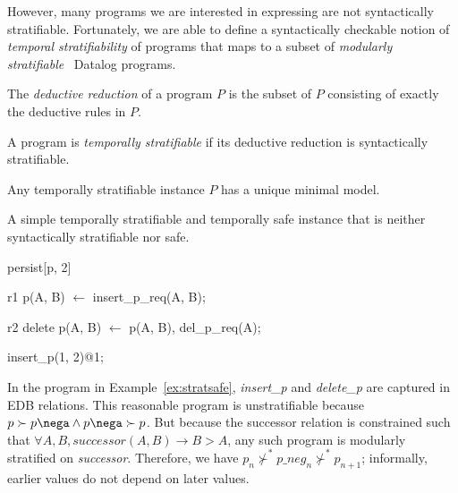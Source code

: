 However, many programs we are interested in expressing are not syntactically
stratifiable.  Fortunately, we are able to define a syntactically checkable
notion of {\em temporal stratifiability} of \slang programs that maps to a
subset of {\em modularly stratifiable}~\cite{modular} Datalog programs.

\begin{definition} 
%
The \emph{deductive reduction} of a \slang program $P$ is
the subset of $P$ consisting of exactly the deductive rules in $P$.
%
\end{definition}

\begin{definition} 
%
A \slang program is \emph{temporally stratifiable} if its deductive
reduction is syntactically stratifiable.
%
\end{definition}

\begin{lemma}
\label{lemma:temp-strat-uniq}
%
Any temporally stratifiable \slang instance $P$ has a unique minimal model.
%
\end{lemma} 


\begin{example}
\label{ex:stratsafe}
A simple temporally stratifiable and temporally safe \slang instance that is neither syntactically stratifiable nor safe.

\begin{Dedalus}
persist[p, 2]  
  
r1
p(A, B) \(\leftarrow\)
  insert\_p\_req(A, B);

r2  
delete p(A, B) \(\leftarrow\)
  p(A, B),
  del\_p\_req(A);

insert\_p(1, 2)@1;
\end{Dedalus}
\end{example}

In the \slang program in Example~\ref{ex:stratsafe}, 
\emph{insert\_p} and \emph{delete\_p} are captured
in EDB relations.  This reasonable program is unstratifiable because $p \succ
p\nega \land p\nega \succ p$.  But because the successor relation is
constrained such that $\forall A,B, successor(A, B) \rightarrow B > A$, any
such program is modularly stratified on \emph{successor}.  Therefore, we have
$p_{n} \not\succ^* p\_neg_{n} \not\succ^* p_{n+1}$; informally, earlier values
do not depend on later values.







